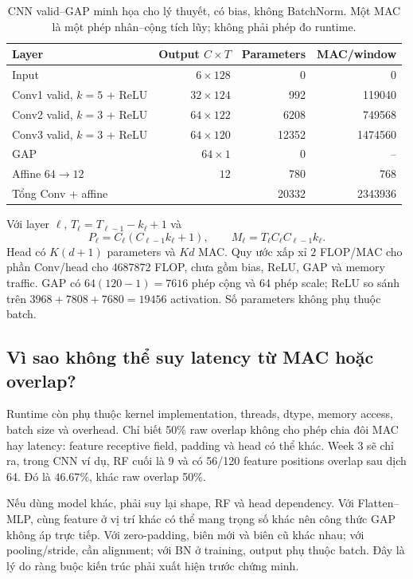 \documentclass[11pt,a4paper]{article}
\theoremstyle{remark}
\begin{document}
\begin{table}[!htbp]\centering\small
\caption{CNN valid--GAP minh họa cho lý thuyết, có bias, không BatchNorm.
Một MAC là một phép nhân--cộng tích lũy; không phải phép đo runtime.}
\label{tab:cnn}
\begin{tabularx}{\linewidth}{@{}Yrrr@{}}\toprule
Layer & Output $C\times T$ & Parameters & MAC/window\\\midrule
Input & $6\times128$ &0&0\\
Conv1 valid, $k=5$ + ReLU & $32\times124$ &992&119040\\
Conv2 valid, $k=3$ + ReLU & $64\times122$ &6208&749568\\
Conv3 valid, $k=3$ + ReLU & $64\times120$ &12352&1474560\\
GAP & $64\times1$ &0&--\\
Affine $64\to12$ & $12$ &780&768\\\midrule
Tổng Conv + affine & &20332&2343936\\\bottomrule
\end{tabularx}
\end{table}
Với layer $\ell$, $T_\ell=T_{\ell-1}-k_\ell+1$ và
\begin{equation}
 P_\ell=C_\ell(C_{\ell-1}k_\ell+1),\qquad
 M_\ell=T_\ell C_\ell C_{\ell-1}k_\ell.
\end{equation}
Head có $K(d+1)$ parameters và $Kd$ MAC. Quy ước xấp xỉ $2$ FLOP/MAC cho
phần Conv/head cho $4687872$ FLOP, chưa gồm bias, ReLU, GAP và memory traffic.
GAP có $64(120-1)=7616$ phép cộng và 64 phép scale; ReLU so sánh trên
$3968+7808+7680=19456$ activation. Số parameters không phụ thuộc batch.

\subsection{Vì sao không thể suy latency từ MAC hoặc overlap?}
Runtime còn phụ thuộc kernel implementation, threads, dtype, memory access,
batch size và overhead. Chỉ biết 50\% raw overlap không cho phép chia đôi
MAC hay latency: feature receptive field, padding và head có thể khác.
Week 3 sẽ chỉ ra, trong CNN ví dụ, RF cuối là 9 và có 56/120 feature
positions overlap sau dịch 64. Đó là $46.67\%$, khác raw overlap 50\%.

Nếu dùng model khác, phải suy lại shape, RF và head dependency. Với
Flatten--MLP, cùng feature ở vị trí khác có thể mang trọng số khác nên công
thức GAP không áp trực tiếp. Với zero-padding, biên mới và biên cũ khác nhau;
với pooling/stride, cần alignment; với BN ở training, output phụ thuộc batch.
Đây là lý do ràng buộc kiến trúc phải xuất hiện trước chứng minh.
\end{document}
